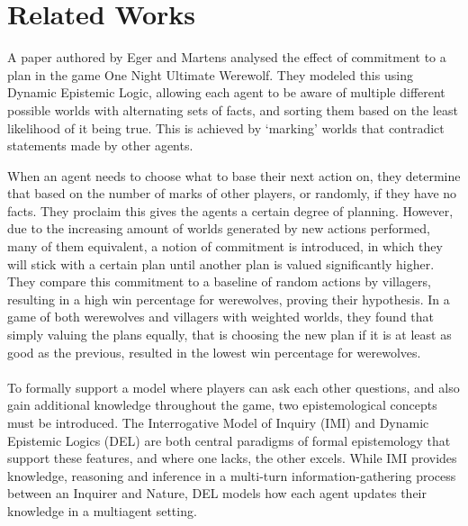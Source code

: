 \section{Related Works}
A paper authored by Eger and Martens\cite{commitment} analysed the effect of
commitment to a plan in the game One Night Ultimate Werewolf. They modeled
this using Dynamic Epistemic Logic, allowing each agent to be aware of multiple
different possible worlds with alternating sets of facts, and sorting them
based on the least likelihood of it being true. This is achieved by ‘marking’
worlds that contradict statements made by other agents.

When an agent needs to choose what to base their next action on, they determine
that based on the number of marks of other players, or randomly, if they have
no facts. They proclaim this gives the agents a certain degree of planning.
However, due to the increasing amount of worlds generated by new actions
performed, many of them equivalent, a notion of commitment is introduced, in
which they will stick with a certain plan until another plan is valued
significantly higher. They compare this commitment to a baseline of random
actions by villagers, resulting in a high win percentage for werewolves,
proving their hypothesis. In a game of both werewolves and villagers with
weighted worlds, they found that simply valuing the plans equally, that is
choosing the new plan if it is at least as good as the previous, resulted in
the lowest win percentage for werewolves.\\ \\ To formally support a model
where players can ask each other questions, and also gain additional knowledge
throughout the game, two epistemological concepts must be introduced. The
Interrogative Model of Inquiry (IMI) and Dynamic Epistemic Logics (DEL) are
both central paradigms of formal epistemology that support these features, and
where one lacks, the other excels. While IMI provides knowledge, reasoning and
inference in a multi-turn information-gathering process between an Inquirer and
Nature, DEL models how each agent updates their knowledge in a multiagent
setting.

